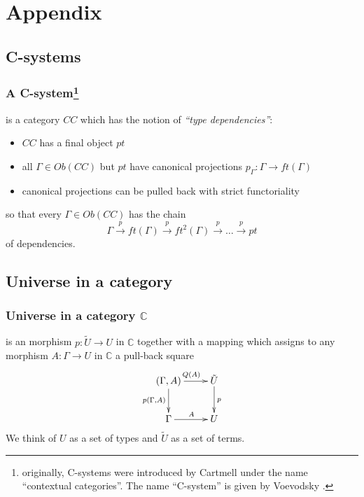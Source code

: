 \documentclass[dvipdfmx]{beamer}
\begin{document}



\section*{Appendix}

\subsection*{C-systems}

\begin{frame}
  \frametitle{A C-system\footnote{
    originally, C-systems were introduced by Cartmell
    \cite{Cartmell1986209}
    under the name ``contextual categories''.
    The name ``C-system'' is given by Voevodsky
    \cite{voevodsky2014subsystems}.
    }
  }
  is a category $CC$ which has the notion of
  {\it ``type dependencies''}:
  \begin{itemize}
    \item $CC$ has a final object $pt$
    \item all $\Gamma \in Ob \left( CC \right)$ but $pt$
      have canonical projections
      $p_{\Gamma} : \Gamma \to ft \left( \Gamma \right)$
    \item canonical projections can be pulled back
      with strict functoriality
  \end{itemize}
  so that every $\Gamma \in Ob \left( CC \right)$
  has the chain
  \[
  \Gamma \overset{p}{\to} ft \left( \Gamma \right)
  \overset{p}{\to} ft^2 \left( \Gamma \right)
  \overset{p}{\to} \dots
  \overset{p}{\to} pt
  \]
  of dependencies.
\end{frame}

\subsection*{Universe in a category}

\begin{frame}
  \frametitle{Universe in a category ${\mathbb C}$}
  is an morphism $p : \tilde{U} \to U$ in ${\mathbb C}$
  together with a mapping which assigns to any morphism
  $A : \Gamma \to U$ in ${\mathbb C}$ a pull-back square
  \[
    \xymatrix{
      \left( \Gamma , A \right) \ar[r]^{Q \left( A \right)}
      \ar[d]_{p \left( \Gamma , A \right)}
        & \tilde{U} \ar[d]^{p}
        \\
        \Gamma \ar[r]^{A}
        & U
    }
  \]
  We think of $U$ as a set of types and
  $\tilde{U}$ as a set of terms.
\end{frame}
\end{document}
